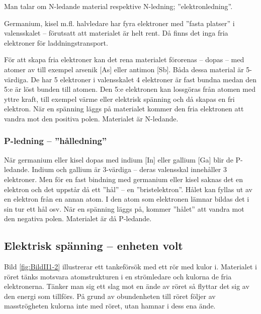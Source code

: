 Man talar om N-ledande material respektive N-ledning; ''elektronledning''.

Germanium, kisel m.fl. halvledare har fyra elektroner med ''fasta platser'' i
valensskalet -- förutsatt att materialet är helt rent.
Då finns det inga fria elektroner för laddningstransport.

För att skapa fria elektroner kan det rena materialet förorenas -- dopas -- med
atomer av till exempel arsenik [As] eller antimon [Sb].
Båda dessa material är 5-värdiga.
De har 5 elektroner i valensskalet 4 elektroner är fast bundna medan
den 5:e är löst bunden till atomen.
Den 5:e elektronen kan lossgöras från atomen med yttre kraft, till exempel värme eller
elektrisk spänning och då skapas en fri elektron.
När en spänning läggs på materialet kommer den fria elektronen att vandra mot
den positiva polen.
Materialet är N-ledande.

\subsubsection{P-ledning -- ''hålledning''}

När germanium eller kisel dopas med indium [In] eller gallium [Ga] blir de
P-ledande.
Indium och gallium är 3-värdiga -- deras valensskal innehåller 3 elektroner.
Men för en fast bindning med germanium eller kisel saknas det en elektron och
det uppstår då ett ''hål'' -- en ''bristelektron''.
Hålet kan fyllas ut av en elektron från en annan atom.
I den atom som elektronen lämnar bildas det i sin tur ett hål osv.
När en spänning läggs på, kommer ''hålet'' att vandra mot den negativa polen.
Materialet är då P-ledande.

\subsection{Elektrisk spänning -- enheten volt}


Bild \ref{fig:BildII1-2} illustrerar ett tankeförsök med ett rör med kulor i.
Materialet i röret tänks motsvara atomstrukturen i en strömledare och kulorna
de fria elektronerna.
Tänker man sig ett slag mot en ände av röret så flyttar det sig av den energi
som tillförs.
På grund av obundenheten till röret följer av masströgheten kulorna inte med
röret, utan hamnar i dess ena ände.

